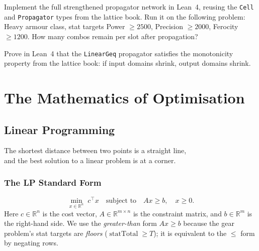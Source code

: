 \documentclass[11pt, a4paper, oneside]{book}
\newcommand{\R}{\mathbb{R}}
\newcommand{\statTotal}{\operatorname{statTotal}}
\begin{document}
\begin{exercisebox}
Implement the full strengthened propagator network in Lean~4, reusing the
\texttt{Cell} and \texttt{Propagator} types from the lattice book.
Run it on the following problem: Heavy armour class, stat targets
Power $\geq 2500$, Precision $\geq 2000$, Ferocity $\geq 1200$.
How many combos remain per slot after propagation?
\end{exercisebox}

\begin{exercisebox}
Prove in Lean~4 that the \texttt{LinearGeq} propagator satisfies the
monotonicity property from the lattice book: if input domains shrink,
output domains shrink.
\end{exercisebox}

\part{The Mathematics of Optimisation}

\chapter{Linear Programming}
\label{ch:lp}

\epigraph{The shortest distance between two points is a straight line,\\
and the best solution to a linear problem is at a corner.}{}

\section{The LP Standard Form}

\begin{defbox}[title={Linear Program (Standard Form)}]
\[
  \min_{x \in \R^n} \; c^\top x
  \quad\text{subject to}\quad
  Ax \geq b, \quad x \geq 0.
\]
Here $c \in \R^n$ is the cost vector, $A \in \R^{m \times n}$ is the
constraint matrix, and $b \in \R^m$ is the right-hand side.  We use the
\emph{greater-than} form $Ax \geq b$ because the gear problem's stat targets are
\emph{floors} ($\statTotal \geq T$); it is equivalent to the $\leq$ form by
negating rows.
\end{defbox}
\end{document}
